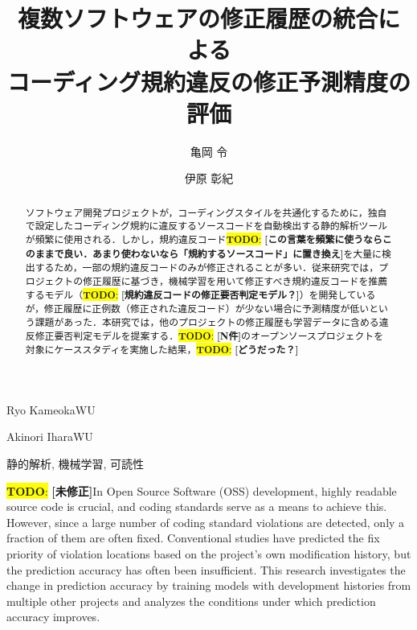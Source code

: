 \documentclass[submit]{ipsj}
\newcommand{\todo}[1]{\colorbox{yellow}{{\bf TODO}:}{\color{red} {\textbf{[#1]}}}}
\begin{document}
\title{複数ソフトウェアの修正履歴の統合による\\コーディング規約違反の修正予測精度の評価}





\author{亀岡 令}{Ryo Kameoka}{WU}
\author{伊原 彰紀}{Akinori Ihara}{WU}

\begin{abstract}
ソフトウェア開発プロジェクトが，コーディングスタイルを共通化するために，独自で設定したコーディング規約に違反するソースコードを自動検出する静的解析ツールが頻繁に使用される．しかし，規約違反コード\todo{この言葉を頻繁に使うならこのままで良い．あまり使わないなら「規約するソースコード」に置き換え}を大量に検出するため，一部の規約違反コードのみが修正されることが多い．従来研究では，プロジェクトの修正履歴に基づき，機械学習を用いて修正すべき規約違反コードを推薦するモデル（\todo{規約違反コードの修正要否判定モデル？}）を開発しているが，修正履歴に正例数（修正された違反コード）が少ない場合に予測精度が低いという課題があった．本研究では，他のプロジェクトの修正履歴も学習データに含める違反修正要否判定モデルを提案する．\todo{N件}のオープンソースプロジェクトを対象にケーススタディを実施した結果，\todo{どうだった？}
\end{abstract}


\begin{jkeyword}
静的解析, 機械学習, 可読性
\end{jkeyword}

\begin{eabstract}
\todo{未修正}In Open Source Software (OSS) development, highly readable source code is crucial, and coding standards serve as a means to achieve this. However, since a large number of coding standard violations are detected, only a fraction of them are often fixed. Conventional studies have predicted the fix priority of violation locations based on the project's own modification history, but the prediction accuracy has often been insufficient. This research investigates the change in prediction accuracy by training models with development histories from multiple other projects and analyzes the conditions under which prediction accuracy improves.
\end{eabstract}
\end{document}
